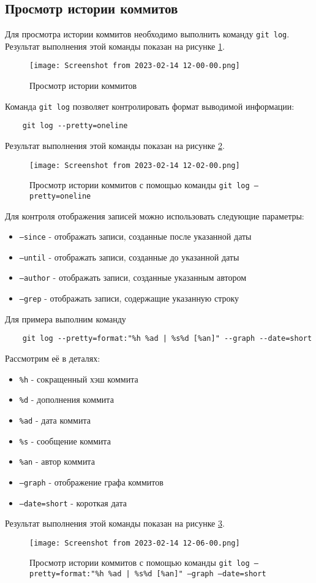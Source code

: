 \subsection{Просмотр истории коммитов}
Для просмотра истории коммитов необходимо выполнить команду \texttt{git log}.
Результат выполнения этой команды показан на рисунке \ref{fig:git:log}.
\begin{figure}[hp]
	\centering
	\texttt{[image: Screenshot from 2023-02-14 12-00-00.png]}
	\caption{Просмотр истории коммитов}
	\label{fig:git:log}
\end{figure}
Команда \texttt{git log} позволяет контролировать формат выводимой информации:
\begin{verbatim}
	git log --pretty=oneline
\end{verbatim}
Результат выполнения этой команды показан на рисунке \ref{fig:git:log:pretty}.
\begin{figure}[hp]
	\centering
	\texttt{[image: Screenshot from 2023-02-14 12-02-00.png]}
	\caption{Просмотр истории коммитов с помощью команды \texttt{git log --pretty=oneline}}
	\label{fig:git:log:pretty}
\end{figure}
Для контроля отображения записей можно использовать следующие параметры:
\begin{itemize}
	\item \texttt{--since} - отображать записи, созданные после указанной даты
	\item \texttt{--until} - отображать записи, созданные до указанной даты
	\item \texttt{--author} - отображать записи, созданные указанным автором
	\item \texttt{--grep} - отображать записи, содержащие указанную строку
\end{itemize}
Для примера выполним команду
\begin{verbatim}
	git log --pretty=format:"%h %ad | %s%d [%an]" --graph --date=short
\end{verbatim}
Рассмотрим её в деталях:
\begin{itemize}
	\item \texttt{\%h} - сокращенный хэш коммита
	\item \texttt{\%d} - дополнения коммита
	\item \texttt{\%ad} - дата коммита
	\item \texttt{\%s} - сообщение коммита
	\item \texttt{\%an} - автор коммита
	\item \texttt{--graph} - отображение графа коммитов
	\item \texttt{--date=short} - короткая дата
\end{itemize}
Результат выполнения этой команды показан на рисунке \ref{fig:git:log:pretty:format}.
\begin{figure}[hp]
	\centering
	\texttt{[image: Screenshot from 2023-02-14 12-06-00.png]}
	\caption{Просмотр истории коммитов с помощью команды \texttt{git log --pretty=format:"\%h \%ad | \%s\%d [\%an]" --graph --date=short}}
	\label{fig:git:log:pretty:format}
\end{figure}

